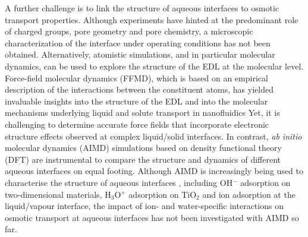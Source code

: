 \documentclass[journal=ancac3,manuscript=article,layout=twocolumn]{achemso}
\begin{document}
A further challenge is to link the  structure of aqueous  interfaces to osmotic transport properties. Although experiments have hinted at the predominant role of charged groups, pore geometry and pore chemistry\cite{Hartkamp2018}, a microscopic characterization of the interface under operating conditions has not been obtained.
Alternatively, atomistic simulations, and in particular molecular dynamics, can be used to explore the structure of the EDL at the molecular level.
Force-field molecular dynamics (FFMD), which is based on an empirical description of the interactions between the constituent atoms, has yielded invaluable insights into the structure of the EDL \cite{Siepmann1995InfluenceSystems, Scalfi2020ChargeEnsemble,scalfi2020a,Limmer2013ChargeCapacitors} and into the molecular mechanisms underlying liquid and solute transport in nanofluidics\cite{striolo2016carbon,phan2016confined,Faucher2019,Falk2010MolecularFriction,Ma2015WaterFriction,xie2018fast,huang2007ion,Ajdari2006,heiranian2015water,noh2020ion,liu2018pressure,simoncelli2018blue,Kalra2003OsmoticMembranes,Vasu2018ElectricallyMembranes}
%
Yet, it is challenging to determine accurate force fields that incorporate
electronic structure effects observed at complex liquid/solid interfaces.
In contrast,
\textit{ab initio} molecular dynamics (AIMD) simulations
based on density functional theory (DFT)
are instrumental to compare
the structure and dynamics of different aqueous
interfaces on equal footing.
Although AIMD is increasingly being used
to characterise the structure of
aqueous interfaces
\cite{le2020molecular,cheng2012alignment,gross2019modelling,lan2020ionization,seiler2018effect},
including OH$^{-}$ adsorption on two-dimensional
materials\cite{Grosjean2016},
H$_3$O$^+$ adsorption on TiO$_2$\cite{stecher2016first}
and ion adsorption at the liquid/vapour interface\cite{duignan2021toward,baer2011toward},
the impact of ion- and water-specific interactions
on osmotic transport at aqueous interfaces has not
been investigated with AIMD so far.
\end{document}
